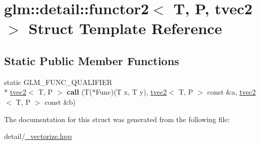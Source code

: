 \hypertarget{structglm_1_1detail_1_1functor2_3_01T_00_01P_00_01tvec2_01_4}{\section{glm\-:\-:detail\-:\-:functor2$<$ T, P, tvec2 $>$ Struct Template Reference}
\label{structglm_1_1detail_1_1functor2_3_01T_00_01P_00_01tvec2_01_4}
}
\subsection*{Static Public Member Functions}
\begin{DoxyCompactItemize}
\item 
\hypertarget{structglm_1_1detail_1_1functor2_3_01T_00_01P_00_01tvec2_01_4_a3f747eea2648beb35126086723c1797f}{static G\-L\-M\-\_\-\-F\-U\-N\-C\-\_\-\-Q\-U\-A\-L\-I\-F\-I\-E\-R \\*
\hyperlink{structglm_1_1tvec2}{tvec2}$<$ T, P $>$ {\bfseries call} (T($\ast$Func)(T x, T y), \hyperlink{structglm_1_1tvec2}{tvec2}$<$ T, P $>$ const \&a, \hyperlink{structglm_1_1tvec2}{tvec2}$<$ T, P $>$ const \&b)}\label{structglm_1_1detail_1_1functor2_3_01T_00_01P_00_01tvec2_01_4_a3f747eea2648beb35126086723c1797f}

\end{DoxyCompactItemize}


The documentation for this struct was generated from the following file\-:\begin{DoxyCompactItemize}
\item 
detail/\hyperlink{__vectorize_8hpp}{\-\_\-vectorize.\-hpp}\end{DoxyCompactItemize}
